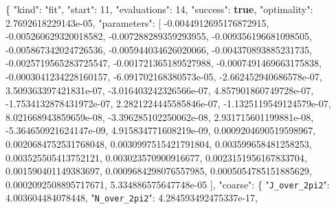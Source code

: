 \documentclass[
  10pt,
]{article}
\newenvironment{Shaded}{}{}
\newcommand{\DataTypeTok}[1]{\textcolor[rgb]{0.56,0.13,0.00}{#1}}
\newcommand{\DecValTok}[1]{\textcolor[rgb]{0.25,0.63,0.44}{#1}}
\newcommand{\FloatTok}[1]{\textcolor[rgb]{0.25,0.63,0.44}{#1}}
\newcommand{\FunctionTok}[1]{\textcolor[rgb]{0.02,0.16,0.49}{#1}}
\newcommand{\KeywordTok}[1]{\textcolor[rgb]{0.00,0.44,0.13}{\textbf{#1}}}
\newcommand{\OtherTok}[1]{\textcolor[rgb]{0.00,0.44,0.13}{#1}}
\newcommand{\StringTok}[1]{\textcolor[rgb]{0.25,0.44,0.63}{#1}}
\begin{document}
\begin{Shaded}
\begin{Highlighting}[]
\FunctionTok{\{}
  \DataTypeTok{"kind"}\FunctionTok{:} \StringTok{"fit"}\FunctionTok{,}
  \DataTypeTok{"start"}\FunctionTok{:} \DecValTok{11}\FunctionTok{,}
  \DataTypeTok{"evaluations"}\FunctionTok{:} \DecValTok{14}\FunctionTok{,}
  \DataTypeTok{"success"}\FunctionTok{:} \KeywordTok{true}\FunctionTok{,}
  \DataTypeTok{"optimality"}\FunctionTok{:} \FloatTok{2.7692618229143e{-}05}\FunctionTok{,}
  \DataTypeTok{"parameters"}\FunctionTok{:} \OtherTok{[}
    \FloatTok{{-}0.0044912695176872915}\OtherTok{,}
    \FloatTok{{-}0.005260629320018582}\OtherTok{,}
    \FloatTok{{-}0.007288289359293955}\OtherTok{,}
    \FloatTok{{-}0.009356196681098505}\OtherTok{,}
    \FloatTok{{-}0.005867342024726536}\OtherTok{,}
    \FloatTok{{-}0.005944034626020066}\OtherTok{,}
    \FloatTok{{-}0.004370893885231735}\OtherTok{,}
    \FloatTok{{-}0.0025719565283725547}\OtherTok{,}
    \FloatTok{{-}0.001721365189527988}\OtherTok{,}
    \FloatTok{{-}0.0007491469663175838}\OtherTok{,}
    \FloatTok{{-}0.0003041234228160157}\OtherTok{,}
    \FloatTok{{-}6.091702168380573e{-}05}\OtherTok{,}
    \FloatTok{{-}2.662452940686578e{-}07}\OtherTok{,}
    \FloatTok{3.509363397421831e{-}07}\OtherTok{,}
    \FloatTok{{-}3.016403242326566e{-}07}\OtherTok{,}
    \FloatTok{4.857901860749728e{-}07}\OtherTok{,}
    \FloatTok{{-}1.7534132878431972e{-}07}\OtherTok{,}
    \FloatTok{2.2821224445585846e{-}07}\OtherTok{,}
    \FloatTok{{-}1.1325119549124579e{-}07}\OtherTok{,}
    \FloatTok{8.021668943859659e{-}08}\OtherTok{,}
    \FloatTok{{-}3.396285102250062e{-}08}\OtherTok{,}
    \FloatTok{2.931715601199881e{-}08}\OtherTok{,}
    \FloatTok{{-}5.364650921624147e{-}09}\OtherTok{,}
    \FloatTok{4.915834771608219e{-}09}\OtherTok{,}
    \FloatTok{0.0009204690519598967}\OtherTok{,}
    \FloatTok{0.0020684752531768048}\OtherTok{,}
    \FloatTok{0.0030997515421791804}\OtherTok{,}
    \FloatTok{0.003599658481258253}\OtherTok{,}
    \FloatTok{0.003525505413752121}\OtherTok{,}
    \FloatTok{0.003023570900916677}\OtherTok{,}
    \FloatTok{0.0023151956167833704}\OtherTok{,}
    \FloatTok{0.001590401149383697}\OtherTok{,}
    \FloatTok{0.0009684298076557985}\OtherTok{,}
    \FloatTok{0.0005054785151885629}\OtherTok{,}
    \FloatTok{0.0002092508895717671}\OtherTok{,}
    \FloatTok{5.334886575647748e{-}05}
  \OtherTok{]}\FunctionTok{,}
  \DataTypeTok{"coarse"}\FunctionTok{:} \FunctionTok{\{}
    \DataTypeTok{"\nolinkurl{J_over_2pi2}"}\FunctionTok{:} \FloatTok{4.003604484078448}\FunctionTok{,}
    \DataTypeTok{"\nolinkurl{N_over_2pi2}"}\FunctionTok{:} \FloatTok{4.284593492475337e{-}17}\FunctionTok{,}

\end{Highlighting}
\end{Shaded}
\end{document}
